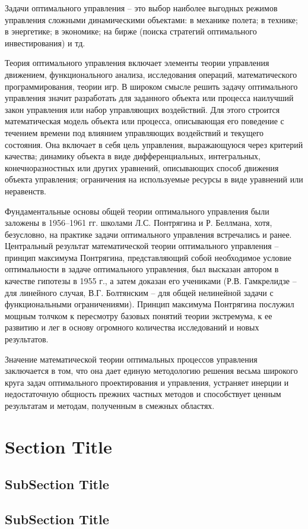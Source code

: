  
Задачи оптимального управления – это выбор наиболее выгодных режимов управления сложными динамическими объектами: в механике полета; в технике; в энергетике; в экономике; на бирже (поиска стратегий оптимального инвестирования) и тд.


Теория оптимального управления включает элементы теории управления движением, функционального анализа, исследования операций, математического программирования, теории игр. В широком смысле решить задачу оптимального управления значит разработать для заданного объекта или процесса наилучший закон управления или набор управляющих воздействий. Для этого строится математическая модель объекта или процесса, описывающая его поведение с течением времени под влиянием управляющих воздействий и текущего состояния. Она включает в себя цель управления, выражающуюся через критерий качества; динамику объекта в виде дифференциальных, интегральных, конечноразностных или других уравнений, описывающих способ движения объекта управления; ограничения на используемые ресурсы в виде уравнений или неравенств.


Фундаментальные основы общей теории оптимального управления были заложены в 1956–1961 гг. школами Л.С. Понтрягина  и Р. Беллмана, хотя, безусловно, на практике задачи оптимального управления встречались и ранее. Центральный результат математической теории оптимального управления – принцип максимума Понтрягина, представляющий собой необходимое условие оптимальности в задаче оптимального управления, был высказан автором в качестве гипотезы в 1955 г., а затем доказан его учениками (Р.В. Гамкрелидзе – для линейного случая, В.Г. Болтянским – для общей нелинейной задачи с функциональными ограничениями). Принцип максимума Понтрягина послужил мощным толчком к пересмотру базовых понятий теории экстремума, к ее развитию и лег в основу огромного количества исследований и новых результатов.


Значение математической теории оптимальных процессов управления заключается в том, что она дает единую методологию решения весьма широкого круга задач оптимального проектирования и управления, устраняет инерции и недостаточную общность прежних частных методов и способствует ценным результатам и методам, полученным в смежных областях.





\section{Section Title}



\subsection{SubSection Title}


\subsection{SubSection Title}
